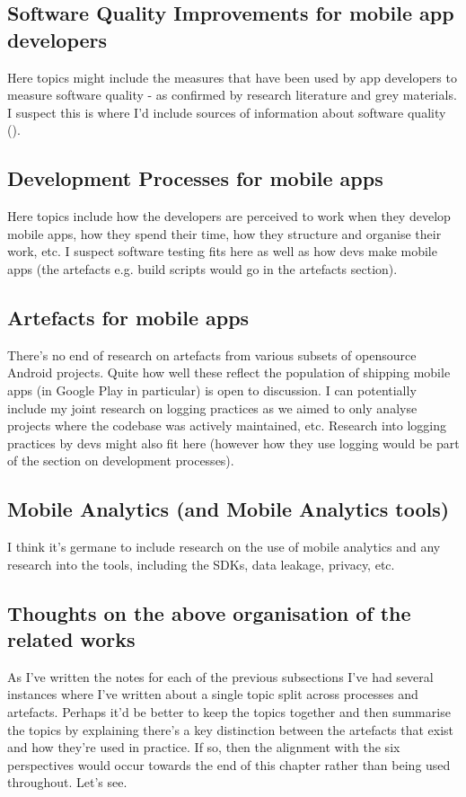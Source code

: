 \subsection{Software Quality Improvements for mobile app developers}
Here topics might include the measures that have been used by app developers to measure software quality - as confirmed by research literature and grey materials. I suspect this is where I'd include sources of information about software quality ().

\subsection{Development Processes for mobile apps}
Here topics include how the developers are perceived to work when they develop mobile apps, how they spend their time, how they structure and organise their work, etc. I suspect software testing fits here as well as how devs make mobile apps (the artefacts e.g. build scripts would go in the artefacts section).

\subsection{Artefacts for mobile apps}
There's no end of research on artefacts from various subsets of opensource Android projects. Quite how well these reflect the population of shipping mobile apps (in Google Play in particular) is open to discussion. I can potentially include my joint research on logging practices as we aimed to only analyse projects where the codebase was actively maintained, etc. Research into logging practices by devs might also fit here (however how they use logging would be part of the section on development processes).

\subsection*{Mobile Analytics (and Mobile Analytics tools)}
I think it's germane to include research on the use of mobile analytics and any research into the tools, including the SDKs, data leakage, privacy, etc.

\subsection*{Thoughts on the above organisation of the related works}
As I've written the notes for each of the previous subsections I've had several instances where I've written about a single topic split across processes and artefacts. Perhaps it'd be better to keep the topics together and then summarise the topics by explaining there's a key distinction between the artefacts that exist and how they're used in practice. If so, then the alignment with the six perspectives would occur towards the end of this chapter rather than being used throughout. Let's see.

